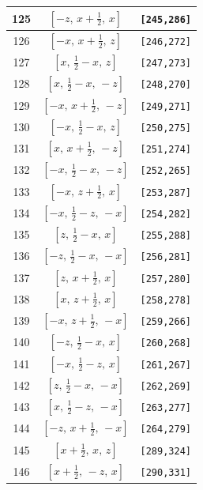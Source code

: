 \documentclass[fleqn,8pt]{jsarticle}
\begin{document}
\begin{longtable}{ccc}
125 & $\left[ - z,\, x + \frac{1}{2},\, x \right]$ & {\tt [245,286]} \\ \hline
126 & $\left[ - x,\, x + \frac{1}{2},\, z \right]$ & {\tt [246,272]} \\ \hline
127 & $\left[ x,\, \frac{1}{2} - x,\, z \right]$ & {\tt [247,273]} \\ \hline
128 & $\left[ x,\, \frac{1}{2} - x,\, - z \right]$ & {\tt [248,270]} \\ \hline
129 & $\left[ - x,\, x + \frac{1}{2},\, - z \right]$ & {\tt [249,271]} \\ \hline
130 & $\left[ - x,\, \frac{1}{2} - x,\, z \right]$ & {\tt [250,275]} \\ \hline
131 & $\left[ x,\, x + \frac{1}{2},\, - z \right]$ & {\tt [251,274]} \\ \hline
132 & $\left[ - x,\, \frac{1}{2} - x,\, - z \right]$ & {\tt [252,265]} \\ \hline
133 & $\left[ - x,\, z + \frac{1}{2},\, x \right]$ & {\tt [253,287]} \\ \hline
134 & $\left[ - x,\, \frac{1}{2} - z,\, - x \right]$ & {\tt [254,282]} \\ \hline
135 & $\left[ z,\, \frac{1}{2} - x,\, x \right]$ & {\tt [255,288]} \\ \hline
136 & $\left[ - z,\, \frac{1}{2} - x,\, - x \right]$ & {\tt [256,281]} \\ \hline
137 & $\left[ z,\, x + \frac{1}{2},\, x \right]$ & {\tt [257,280]} \\ \hline
138 & $\left[ x,\, z + \frac{1}{2},\, x \right]$ & {\tt [258,278]} \\ \hline
139 & $\left[ - x,\, z + \frac{1}{2},\, - x \right]$ & {\tt [259,266]} \\ \hline
140 & $\left[ - z,\, \frac{1}{2} - x,\, x \right]$ & {\tt [260,268]} \\ \hline
141 & $\left[ - x,\, \frac{1}{2} - z,\, x \right]$ & {\tt [261,267]} \\ \hline
142 & $\left[ z,\, \frac{1}{2} - x,\, - x \right]$ & {\tt [262,269]} \\ \hline
143 & $\left[ x,\, \frac{1}{2} - z,\, - x \right]$ & {\tt [263,277]} \\ \hline
144 & $\left[ - z,\, x + \frac{1}{2},\, - x \right]$ & {\tt [264,279]} \\ \hline
145 & $\left[ x + \frac{1}{2},\, x,\, z \right]$ & {\tt [289,324]} \\ \hline
146 & $\left[ x + \frac{1}{2},\, - z,\, x \right]$ & {\tt [290,331]} \\ \hline

\end{longtable}
\end{document}
